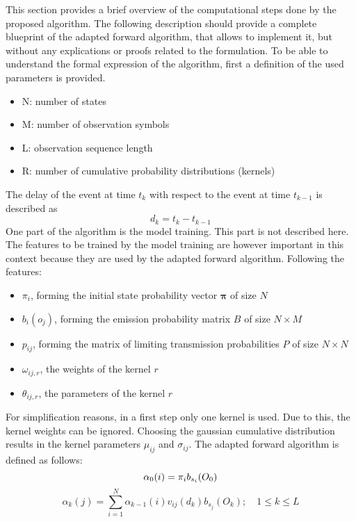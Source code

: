 \documentclass[12pt]{article} %
\begin{document}
This section provides a brief overview of the computational steps done by the
proposed algorithm. The following description should provide a complete
blueprint of the adapted forward algorithm, that allows to implement it, but
without any explications or proofs related to the formulation. To be able to
understand the formal expression of the algorithm, first a definition of the
used parameters is provided.
\begin{itemize}
    \item N: number of states
    \item M: number of observation symbols
    \item L: observation sequence length
    \item R: number of cumulative probability distributions (kernels)
\end{itemize}
The delay of the event at time $ t_k $ with respect to the event at time
$ t_{k-1} $ is described as
\begin{equation}
    d_k = t_k-t_{k-1}
\end{equation}
One part of the algorithm is the model training. This part is not described
here. The features to be trained by the model training are however important
in this context because they are used by the adapted forward algorithm.
Following the features:
\begin{itemize}
    \item $ \pi_i $, forming the initial state probability vector
        $ \boldsymbol{\pi} $ of size $ N $
    \item $ b_i(o_j) $, forming the emission probability matrix $ B $ of size
        $ N \times M $
    \item $ p_{ij} $, forming the matrix of limiting transmission probabilities
        $ P $ of size $ N \times N $
    \item $ \omega_{ij, r} $, the weights of the kernel $ r $
    \item $ \theta_{ij, r} $, the parameters of the kernel $ r $
\end{itemize}
For simplification reasons, in a first step only one kernel is used. Due to 
this, the kernel weights can be ignored. Choosing the gaussian cumulative
distribution results in the kernel parameters $ \mu_{ij} $ and $ \sigma_{ij} $.
The adapted forward algorithm is defined as follows:
\begin{equation}
    \alpha_0(i) = \pi_{i}b_{s_i}(O_0) \\
\end{equation}
\begin{equation}
    \alpha_k(j) = \sum_{i=1}^{N} \alpha_{k-1}(i) v_{ij}(d_k) b_{s_j}(O_k);
    \quad 1 \leq k \leq L
\end{equation}
\end{document}
